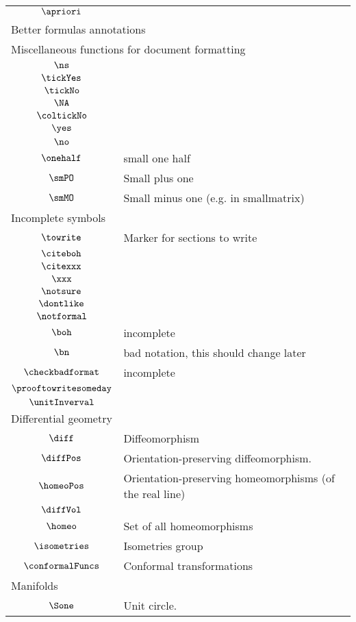\begin{longtable}{cl}
 $\apriori$ & \\ 
 \multicolumn{2}{l}{Better formulas annotations}\\ 
 \hline
\multicolumn{2}{l}{Miscellaneous functions for document formatting}\\ 
 \hline
$\ns$ & \\ 
 $\tickYes$ & \\ 
 $\tickNo$ & \\ 
 $\NA$ & \\ 
 $\coltickNo$ & \\ 
 $\yes$ & \\ 
 $\no$ & \\ 
 $\onehalf$ &  small one half\\ 
 $\smPO$ &  Small plus one \\ 
 $\smMO$ &  Small minus one (e.g. in smallmatrix)\\ 
 \multicolumn{2}{l}{Incomplete symbols}\\ 
 \hline
$\towrite$ &  Marker for sections to write\\ 
 $\citeboh$ & \\ 
 $\citexxx$ & \\ 
 $\xxx$ & \\ 
 $\notsure$ & \\ 
 $\dontlike$ & \\ 
 $\notformal$ & \\ 
 $\boh$ &  incomplete\\ 
 $\bn$ &  bad notation, this should change later\\ 
 $\checkbadformat$ &  incomplete\\ 
 $\prooftowritesomeday$ & \\ 
 $\unitInverval$ & \\ 
 \multicolumn{2}{l}{Differential geometry}\\ 
 \hline
$\diff$ &  Diffeomorphism\\ 
 $\diffPos$ &  Orientation-preserving diffeomorphism.\\ 
 $\homeoPos$ &  Orientation-preserving homeomorphisms (of the real line)\\ 
 $\diffVol$ & \\ 
 $\homeo$ &  Set of all homeomorphisms\\ 
 $\isometries$ &  Isometries group\\ 
 $\conformalFuncs$ &  Conformal transformations\\ 
 \multicolumn{2}{l}{Manifolds}\\ 
 \hline
$\Sone$ &  Unit circle.\\ 

\end{longtable}

